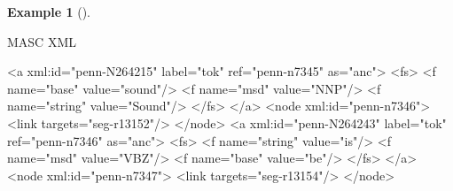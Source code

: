 \documentclass[
  letterpaper,
  DIV=11,
  numbers=noendperiod]{scrreprt}
\newenvironment{Shaded}{\begin{snugshade}}{\end{snugshade}}
\newcommand{\KeywordTok}[1]{\textcolor[rgb]{0.00,0.00,0.00}{#1}}
\newcommand{\NormalTok}[1]{\textcolor[rgb]{0.00,0.00,0.00}{#1}}
\newcommand{\OtherTok}[1]{\textcolor[rgb]{0.00,0.00,0.00}{#1}}
\newcommand{\StringTok}[1]{\textcolor[rgb]{0.00,0.00,0.00}{#1}}
\theoremstyle{definition}
\newtheorem{example}{Example}[chapter]
\theoremstyle{remark}
\begin{document}
\begin{example}[]\protect\hypertarget{exm-masc-xml}{}\label{exm-masc-xml}

MASC XML

\begin{Shaded}
\begin{Highlighting}[]
\NormalTok{\textless{}}\KeywordTok{a}\OtherTok{ xml:id=}\StringTok{"penn{-}N264215"}\OtherTok{ label=}\StringTok{"tok"}\OtherTok{ ref=}\StringTok{"penn{-}n7345"}\OtherTok{ as=}\StringTok{"anc"}\NormalTok{\textgreater{}}
\NormalTok{  \textless{}}\KeywordTok{fs}\NormalTok{\textgreater{}}
\NormalTok{    \textless{}}\KeywordTok{f}\OtherTok{ name=}\StringTok{"base"}\OtherTok{ value=}\StringTok{"sound"}\NormalTok{/\textgreater{}}
\NormalTok{    \textless{}}\KeywordTok{f}\OtherTok{ name=}\StringTok{"msd"}\OtherTok{ value=}\StringTok{"NNP"}\NormalTok{/\textgreater{}}
\NormalTok{    \textless{}}\KeywordTok{f}\OtherTok{ name=}\StringTok{"string"}\OtherTok{ value=}\StringTok{"Sound"}\NormalTok{/\textgreater{}}
\NormalTok{  \textless{}/}\KeywordTok{fs}\NormalTok{\textgreater{}}
\NormalTok{\textless{}/}\KeywordTok{a}\NormalTok{\textgreater{}}
\NormalTok{\textless{}}\KeywordTok{node}\OtherTok{ xml:id=}\StringTok{"penn{-}n7346"}\NormalTok{\textgreater{}}
\NormalTok{  \textless{}}\KeywordTok{link}\OtherTok{ targets=}\StringTok{"seg{-}r13152"}\NormalTok{/\textgreater{}}
\NormalTok{\textless{}/}\KeywordTok{node}\NormalTok{\textgreater{}}
\NormalTok{\textless{}}\KeywordTok{a}\OtherTok{ xml:id=}\StringTok{"penn{-}N264243"}\OtherTok{ label=}\StringTok{"tok"}\OtherTok{ ref=}\StringTok{"penn{-}n7346"}\OtherTok{ as=}\StringTok{"anc"}\NormalTok{\textgreater{}}
\NormalTok{  \textless{}}\KeywordTok{fs}\NormalTok{\textgreater{}}
\NormalTok{    \textless{}}\KeywordTok{f}\OtherTok{ name=}\StringTok{"string"}\OtherTok{ value=}\StringTok{"is"}\NormalTok{/\textgreater{}}
\NormalTok{    \textless{}}\KeywordTok{f}\OtherTok{ name=}\StringTok{"msd"}\OtherTok{ value=}\StringTok{"VBZ"}\NormalTok{/\textgreater{}}
\NormalTok{    \textless{}}\KeywordTok{f}\OtherTok{ name=}\StringTok{"base"}\OtherTok{ value=}\StringTok{"be"}\NormalTok{/\textgreater{}}
\NormalTok{  \textless{}/}\KeywordTok{fs}\NormalTok{\textgreater{}}
\NormalTok{\textless{}/}\KeywordTok{a}\NormalTok{\textgreater{}}
\NormalTok{\textless{}}\KeywordTok{node}\OtherTok{ xml:id=}\StringTok{"penn{-}n7347"}\NormalTok{\textgreater{}}
\NormalTok{  \textless{}}\KeywordTok{link}\OtherTok{ targets=}\StringTok{"seg{-}r13154"}\NormalTok{/\textgreater{}}
\NormalTok{\textless{}/}\KeywordTok{node}\NormalTok{\textgreater{}}
\end{Highlighting}
\end{Shaded}

\end{example}
\end{document}
